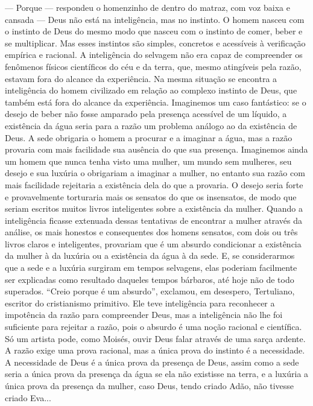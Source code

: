 --- Porque --- respondeu o homenzinho de dentro do matraz, com voz baixa
e cansada --- Deus não está na inteligência, mas no instinto. O homem
nasceu com o instinto de Deus do mesmo modo que nasceu com o instinto de
comer, beber e se multiplicar. Mas esses instintos são simples,
concretos e acessíveis à verificação empírica e racional. A inteligência
do selvagem não era capaz de compreender os fenômenos físicos
científicos do céu e da terra, que, mesmo atingíveis pela razão, estavam
fora do alcance da experiência. Na mesma situação se encontra a
inteligência do homem civilizado em relação ao complexo instinto de
Deus, que também está fora do alcance da experiência. Imaginemos um caso
fantástico: se o desejo de beber não fosse amparado pela presença
acessível de um líquido, a existência da água seria para a razão um
problema análogo ao da existência de Deus. A sede obrigaria o homem a
procurar e a imaginar a água, mas a razão provaria com mais facilidade
sua ausência do que sua presença. Imaginemos ainda um homem que nunca
tenha visto uma mulher, um mundo sem mulheres, seu desejo e sua luxúria
o obrigariam a imaginar a mulher, no entanto sua razão com mais
facilidade rejeitaria a existência dela do que a provaria. O desejo
seria forte e provavelmente torturaria mais os sensatos do que os
insensatos, de modo que seriam escritos muitos livros inteligentes sobre
a existência da mulher. Quando a inteligência ficasse extenuada dessas
tentativas de encontrar a mulher através da análise, os mais honestos e
consequentes dos homens sensatos, com dois ou três livros claros e
inteligentes, provariam que é um absurdo condicionar a existência da
mulher à da luxúria ou a existência da água à da sede. E, se
considerarmos que a sede e a luxúria surgiram em tempos selvagens, elas
poderiam facilmente ser explicadas como resultado daqueles tempos
bárbaros, até hoje não de todo superados. ``Creio porque é um absurdo'',
exclamou, em desespero, Tertuliano, escritor do cristianismo primitivo.
Ele teve inteligência para reconhecer a impotência da razão para
compreender Deus, mas a inteligência não lhe foi suficiente para
rejeitar a razão, pois o absurdo é uma noção racional e científica. Só
um artista pode, como Moisés, ouvir Deus falar através de uma sarça
ardente. A razão exige uma prova racional, mas a única prova do instinto
é a necessidade. A necessidade de Deus é a única prova da presença de
Deus, assim como a sede seria a única prova da presença da água se ela
não existisse na terra, e a luxúria a única prova da presença da mulher,
caso Deus, tendo criado Adão, não tivesse criado Eva...

